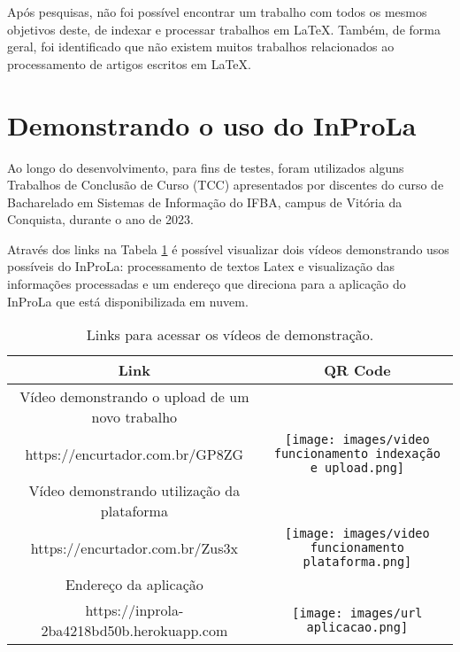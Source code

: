 \documentclass[12pt]{article}
\begin{document}
Após pesquisas, não foi possível encontrar um trabalho com todos os mesmos objetivos deste, de indexar e processar trabalhos em LaTeX. Também, de forma geral, foi identificado que não existem muitos trabalhos relacionados ao processamento de artigos escritos em LaTeX.

\section{Demonstrando o uso do InProLa}

Ao longo do desenvolvimento, para fins de testes, foram utilizados alguns Trabalhos de Conclusão de Curso (TCC) apresentados por discentes do curso de Bacharelado em Sistemas de Informação do IFBA, campus de Vitória da Conquista, durante o ano de 2023. 

Através dos links na Tabela \ref{tab:contribuicoes} é possível visualizar dois vídeos demonstrando usos possíveis do InProLa: processamento de textos Latex e visualização das informações processadas e um endereço que direciona para a aplicação do InProLa que está disponibilizada em nuvem.       

\begin{table}[ht!]
\centering
\caption{Links para acessar os vídeos de demonstração.}
\label{tab:contribuicoes}
\begin{tabular}{ |c|c| } 
 \hline
 \textbf{Link} & \textbf{QR Code} \\ 
 \hline
 Vídeo demonstrando o upload de um novo trabalho \\https://encurtador.com.br/GP8ZG & 
  \begin{minipage}{.3\textwidth}
    \centering
    \texttt{[image: images/video funcionamento indexação e upload.png]}
 \end{minipage}
 \\
 \hline
 Vídeo demonstrando utilização da plataforma  \\ 
 https://encurtador.com.br/Zus3x & 
  \begin{minipage}{.3\textwidth}
    \centering
    \texttt{[image: images/video funcionamento plataforma.png]}
 \end{minipage}
 \\ 
   \hline
  Endereço da aplicação
  \\https://inprola-2ba4218bd50b.herokuapp.com & 
 \begin{minipage}{.3\textwidth}
    \centering
    \texttt{[image: images/url aplicacao.png]}
 \end{minipage}
 \\ 
 \hline
\end{tabular}
\end{table}
\end{document}
